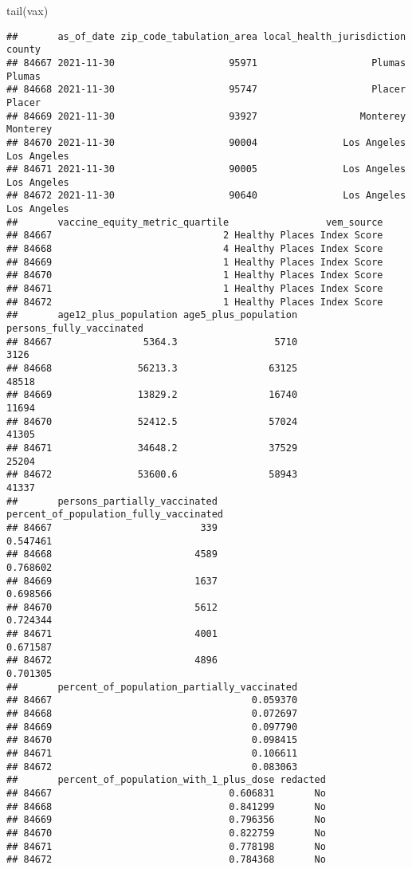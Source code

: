 \documentclass[
]{article}
\newenvironment{Shaded}{\begin{snugshade}}{\end{snugshade}}
\newcommand{\FunctionTok}[1]{\textcolor[rgb]{0.00,0.00,0.00}{#1}}
\newcommand{\NormalTok}[1]{#1}
\begin{document}
\begin{Shaded}
\begin{Highlighting}[]
\FunctionTok{tail}\NormalTok{(vax)}
\end{Highlighting}
\end{Shaded}

\begin{verbatim}
##       as_of_date zip_code_tabulation_area local_health_jurisdiction      county
## 84667 2021-11-30                    95971                    Plumas      Plumas
## 84668 2021-11-30                    95747                    Placer      Placer
## 84669 2021-11-30                    93927                  Monterey    Monterey
## 84670 2021-11-30                    90004               Los Angeles Los Angeles
## 84671 2021-11-30                    90005               Los Angeles Los Angeles
## 84672 2021-11-30                    90640               Los Angeles Los Angeles
##       vaccine_equity_metric_quartile                 vem_source
## 84667                              2 Healthy Places Index Score
## 84668                              4 Healthy Places Index Score
## 84669                              1 Healthy Places Index Score
## 84670                              1 Healthy Places Index Score
## 84671                              1 Healthy Places Index Score
## 84672                              1 Healthy Places Index Score
##       age12_plus_population age5_plus_population persons_fully_vaccinated
## 84667                5364.3                 5710                     3126
## 84668               56213.3                63125                    48518
## 84669               13829.2                16740                    11694
## 84670               52412.5                57024                    41305
## 84671               34648.2                37529                    25204
## 84672               53600.6                58943                    41337
##       persons_partially_vaccinated percent_of_population_fully_vaccinated
## 84667                          339                               0.547461
## 84668                         4589                               0.768602
## 84669                         1637                               0.698566
## 84670                         5612                               0.724344
## 84671                         4001                               0.671587
## 84672                         4896                               0.701305
##       percent_of_population_partially_vaccinated
## 84667                                   0.059370
## 84668                                   0.072697
## 84669                                   0.097790
## 84670                                   0.098415
## 84671                                   0.106611
## 84672                                   0.083063
##       percent_of_population_with_1_plus_dose redacted
## 84667                               0.606831       No
## 84668                               0.841299       No
## 84669                               0.796356       No
## 84670                               0.822759       No
## 84671                               0.778198       No
## 84672                               0.784368       No
\end{verbatim}
\end{document}
